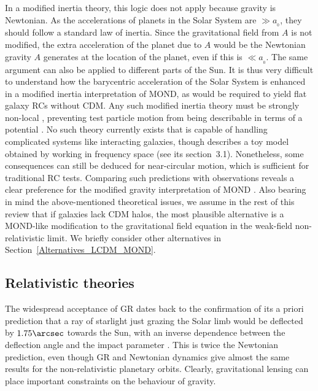 \documentclass[fleqn,usenatbib,useAMS]{mnras} %
\begin{document}
In a modified inertia theory, this logic does not apply because gravity is Newtonian. As the accelerations of planets in the Solar System are $\gg a_{_0}$, they should follow a standard law of inertia. Since the gravitational field from $A$ is not modified, the extra acceleration of the planet due to $A$ would be the Newtonian gravity $A$ generates at the location of the planet, even if this is $\ll a_{_0}$. The same argument can also be applied to different parts of the Sun. It is thus very difficult to understand how the barycentric acceleration of the Solar System is enhanced in a modified inertia interpretation of MOND, as would be required to yield flat galaxy RCs without CDM. Any such modified inertia theory must be strongly non-local \citep{Milgrom_2011}, preventing test particle motion from being describable in terms of a potential \citep{Shariati_2021}. No such theory currently exists that is capable of handling complicated systems like interacting galaxies, though \citet{Milgrom_2011} describes a toy model obtained by working in frequency space (see its section~3.1). Nonetheless, some consequences can still be deduced for near-circular motion, which is sufficient for traditional RC tests. Comparing such predictions with observations reveals a clear preference for the modified gravity interpretation of MOND \citep{Petersen_2020}. Also bearing in mind the above-mentioned theoretical issues, we assume in the rest of this review that if galaxies lack CDM halos, the most plausible alternative is a MOND-like modification to the gravitational field equation in the weak-field non-relativistic limit. We briefly consider other alternatives in Section~\ref{Alternatives_LCDM_MOND}.



\subsection{Relativistic theories}
\label{Relativistic_MOND}

The widespread acceptance of GR dates back to the confirmation of its a priori prediction that a ray of starlight just grazing the Solar limb would be deflected by $1.75 \arcsec$ towards the Sun, with an inverse dependence between the deflection angle and the impact parameter \citep{Dyson_1920}. This is twice the Newtonian prediction, even though GR and Newtonian dynamics give almost the same results for the non-relativistic planetary orbits. Clearly, gravitational lensing can place important constraints on the behaviour of gravity.
\end{document}
